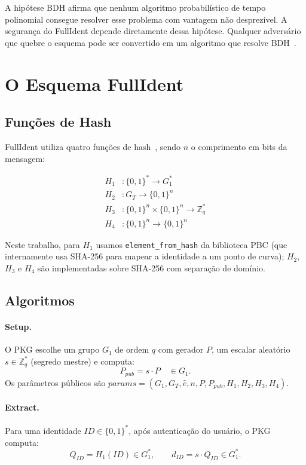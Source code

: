 A hipótese BDH afirma que nenhum algoritmo probabilístico de tempo polinomial consegue resolver
esse problema com vantagem não desprezível. A segurança do FullIdent depende diretamente dessa
hipótese. Qualquer adversário que quebre o esquema pode ser convertido em um algoritmo que
resolve BDH~\cite{boneh2001ibe}.


\section{O Esquema FullIdent}
\label{sec:fullident}

\subsection{Funções de Hash}

FullIdent utiliza quatro funções de hash~\cite{boneh2001ibe}, sendo $n$ o comprimento em bits
da mensagem:

\begin{align*}
  H_1 &: \{0,1\}^* \rightarrow G_1^* \\
  H_2 &: G_T \rightarrow \{0,1\}^n \\
  H_3 &: \{0,1\}^n \times \{0,1\}^n \rightarrow \mathbb{Z}_q^* \\
  H_4 &: \{0,1\}^n \rightarrow \{0,1\}^n
\end{align*}

Neste trabalho, para $H_1$ usamos \texttt{element\_from\_hash} da biblioteca PBC (que
internamente usa SHA-256 para mapear a identidade a um ponto de curva); $H_2$, $H_3$ e $H_4$
são implementadas sobre SHA-256 com separação de domínio.

\subsection{Algoritmos}

\paragraph{Setup.} O PKG escolhe um grupo $G_1$ de ordem $q$ com gerador $P$, um escalar
aleatório $s \in \mathbb{Z}_q^*$ (segredo mestre) e computa:
\[ P_{\mathit{pub}} = s \cdot P \quad \in G_1. \]
Os parâmetros públicos são $\mathit{params} = (G_1, G_T, \hat{e}, n, P, P_{\mathit{pub}},
H_1, H_2, H_3, H_4)$.

\paragraph{Extract.} Para uma identidade $\mathit{ID} \in \{0,1\}^*$, após autenticação do
usuário, o PKG computa:
\[ Q_{\mathit{ID}} = H_1(\mathit{ID}) \in G_1^*, \qquad d_{\mathit{ID}} = s \cdot Q_{\mathit{ID}} \in G_1^*. \]

